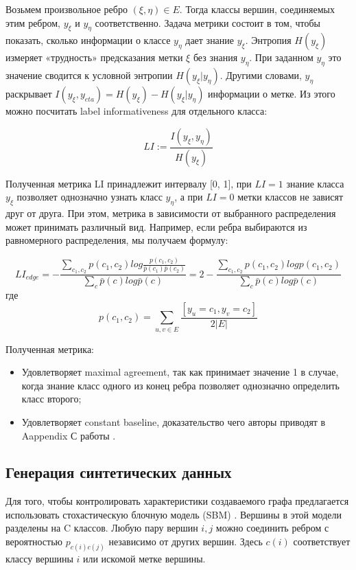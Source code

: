 \documentclass[a4paper,14pt]{article}
\begin{document}
	
	Возьмем произвольное ребро $ (\xi, \eta) \in E $. Тогда классы вершин, соединяемых этим ребром, $y_{\xi}$ и $y_{\eta} $ соответственно.
	Задача метрики состоит в том, чтобы показать, сколько информации о классе $ y_{\eta} $ дает знание $ y_{\xi} $.
	Энтропия $ H(y_{\xi}) $ измеряет «трудность» предсказания метки $ \xi $ без знания $ y_{\eta} $.
	При заданном $ y_{\eta} $ это значение сводится к условной энтропии $ H(y_{\xi}|y_{\eta}) $.
	Другими словами, $ y_{\eta} $ раскрывает $ I(y_{\xi},y_{eta}) = H(y_{\xi}) − H(y_{\xi}|y_{\eta}) $ информации о метке.
	Из этого можно посчитать label informativeness для отдельного класса:
	
	$$ LI := \frac{I( y_{\xi}, y_{\eta} )}{H(y_{\xi})} $$
	
	Полученная метрика LI принадлежит интервалу [0, 1], при $ LI = 1 $ знание класса $ y_{\xi} $ позволяет однозначно узнать класс $ y_{\eta} $, а при $ LI = 0 $ метки классов не зависят друг от друга.
	При этом, метрика в зависимости от выбранного распределения может принимать различный вид. Например, если ребра выбираются из равномерного распределения, мы получаем формулу:
	
	$$ LI_{edge} = - \frac{ \sum_{c_1, c_2} p(c_1, c_2) log \frac{ p(c_1, c_2) }{ \bar{p}(c_1) \bar{p}(c_2) } }{ \sum_c \bar{p}(c) log \bar{p}(c) } = 2 - \frac{  \sum_{c_1, c_2} p(c_1, c_2)  log p(c_1, c_2) }{ \sum_c \bar{p}(c) log \bar{p}(c) } $$
	где $$ p(c_1, c_2) = \sum_{u, v \in E} \frac{ [y_u = c_1, y_v = c_2] }{ 2|E| } $$
	
	Полученная метрика:
	\begin{itemize}
		\item Удовлетворяет maximal agreement, так как принимает значение 1 в случае, когда знание класс одного из конец ребра позволяет однозначно определить класс второго;
		
		\item Удовлетворяет constant baseline, доказательство чего авторы приводят в Aappendix С работы \cite{platonov2022characterizing}.
	\end{itemize}
	
	\subsection{Генерация синтетических данных}
	
	Для того, чтобы контролировать характеристики создаваемого графа предлагается использовать стохастическую блочную модель (SBM) \cite{holland1983stochastic}.
	Вершины в этой модели разделены на C классов.
	Любую пару вершин $i,j$ можно соединить ребром с вероятностью $p_{c(i)c(j)}$  независимо от других вершин.
	Здесь $c(i)$ соответствует классу вершины $i$ или искомой метке вершины.
	
\end{document}
